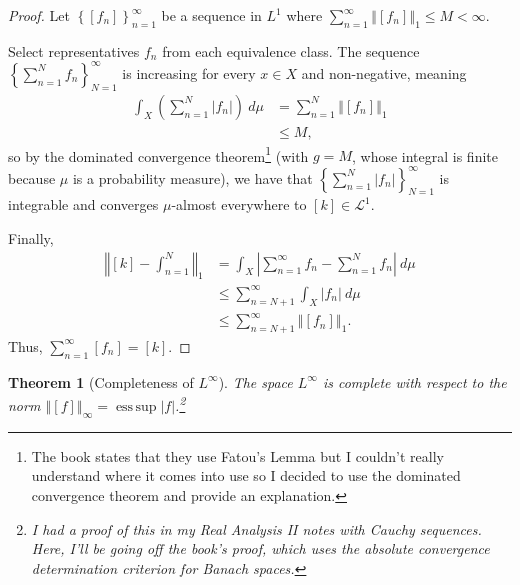\documentclass[10pt]{extarticle}
\newcommand{\norm}[1]{\left\Vert #1\right\Vert}
\newcommand{\set}[1]{\left\{#1\right\}}
\DeclareMathOperator*{\esssup}{ess\,sup}
\theoremstyle{plain}
\newtheorem*{theorem}{Theorem}
\theoremstyle{definition}
\theoremstyle{note}
\renewcommand{\newline}{\hfill\break}
\begin{document}
\begin{proof}
  Let $\set{\left[f_n\right]}_{n=1}^{\infty}$ be a sequence in $L^{1}$ where $\sum_{n=1}^{\infty}\norm{[f_n]}_1 \leq M < \infty$.\newline

   Select representatives $f_n$ from each equivalence class. The sequence $\set{\sum_{n=1}^{N}f_n}_{N=1}^{\infty}$ is increasing for every $x\in X$ and non-negative, meaning
   \begin{align*}
     \int_{X}\left(\sum_{n=1}^{N}|f_n|\right)\:d\mu &= \sum_{n=1}^{N}\norm{[f_n]}_{1}\\
                                                    &\leq M,
   \end{align*}
   so by the dominated convergence theorem\footnote{The book states that they use Fatou's Lemma but I couldn't really understand where it comes into use so I decided to use the dominated convergence theorem and provide an explanation.} (with $g = M$, whose integral is finite because $\mu$ is a probability measure), we have that $\set{\sum_{n=1}^{N}|f_n|}_{N=1}^{\infty}$ is integrable and converges $\mu$-almost everywhere to $[k]\in \mathcal{L}^{1}$.\newline

   Finally,
   \begin{align*}
     \norm{[k] - \int_{n=1}^{N}}_{1} &= \int_{X}^{} \left\vert \sum_{n=1}^{\infty}f_n - \sum_{n=1}^{N}f_n \right\vert\:d\mu\\
                                     &\leq \sum_{n=N+1}^{\infty}\int_{X}^{} \left\vert f_n \right\vert\:d\mu\\
                                     &\leq \sum_{n=N+1}^{\infty}\norm{[f_n]}_1.
   \end{align*}
   Thus, $\sum_{n=1}^{\infty}[f_n] = [k]$.
\end{proof}
\begin{theorem}[Completeness of $L^{\infty}$]
  The space $L^{\infty}$ is complete with respect to the norm $\norm{[f]}_{\infty} = \esssup |f|$.\footnote{I had a proof of this in my Real Analysis II notes with Cauchy sequences. Here, I'll be going off the book's proof, which uses the absolute convergence determination criterion for Banach spaces.}
\end{theorem}
\end{document}

